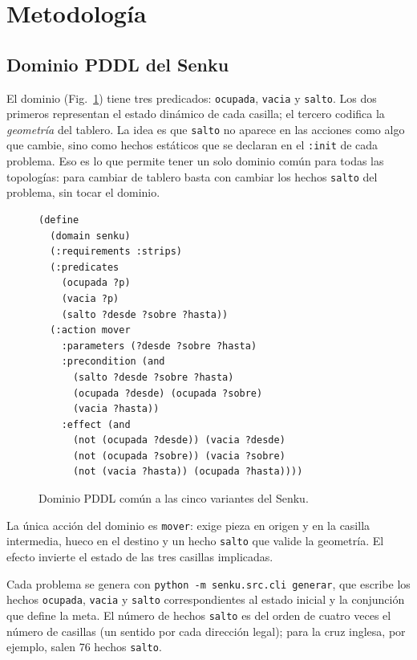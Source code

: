\documentclass[conference,a4paper]{IEEEtran}
\begin{document}
\section{Metodología}
\label{sec:meto}


\subsection{Dominio PDDL del Senku}

El dominio (Fig.~\ref{pcd:dominio-pddl}) tiene tres predicados:
\texttt{ocupada}, \texttt{vacia} y \texttt{salto}. Los dos primeros
representan el estado dinámico de cada casilla; el tercero codifica la
\emph{geometría} del tablero. La idea es que \texttt{salto} no aparece en
las acciones como algo que cambie, sino como hechos estáticos que se
declaran en el \texttt{:init} de cada problema. Eso es lo que permite
tener un solo dominio común para todas las topologías: para cambiar de
tablero basta con cambiar los hechos \texttt{salto} del problema, sin
tocar el dominio.

\begin{figure}[H]
\centering
\small
\begin{verbatim}
(define
  (domain senku)
  (:requirements :strips)
  (:predicates
    (ocupada ?p)
    (vacia ?p)
    (salto ?desde ?sobre ?hasta))
  (:action mover
    :parameters (?desde ?sobre ?hasta)
    :precondition (and
      (salto ?desde ?sobre ?hasta)
      (ocupada ?desde) (ocupada ?sobre)
      (vacia ?hasta))
    :effect (and
      (not (ocupada ?desde)) (vacia ?desde)
      (not (ocupada ?sobre)) (vacia ?sobre)
      (not (vacia ?hasta)) (ocupada ?hasta))))
\end{verbatim}
\caption{Dominio PDDL común a las cinco variantes del Senku.}
\label{pcd:dominio-pddl}
\end{figure}

La única acción del dominio es \texttt{mover}: exige pieza en origen y en
la casilla intermedia, hueco en el destino y un hecho \texttt{salto} que
valide la geometría. El efecto invierte el estado de las tres casillas
implicadas.

Cada problema se genera con \verb|python -m senku.src.cli generar|, que
escribe los hechos \texttt{ocupada}, \texttt{vacia} y \texttt{salto}
correspondientes al estado inicial y la conjunción que define la meta. El
número de hechos \texttt{salto} es del orden de cuatro veces el número de
casillas (un sentido por cada dirección legal); para la cruz inglesa, por
ejemplo, salen 76 hechos \texttt{salto}.
\end{document}
